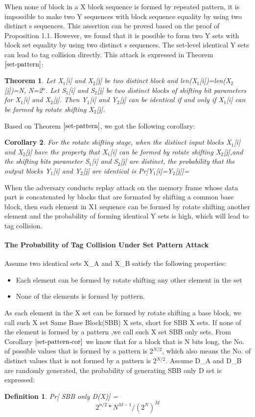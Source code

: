 \documentclass{article}
\newtheorem{theorem}{Theorem}[section]
\newtheorem{corollary}[theorem]{Corollary}
\newtheorem{defination}{Definition}[section]
\begin{document}
When none of block in a X block sequence is formed by repeated pattern, it is impossible to make two Y sequences with block sequence equality by using two distinct s sequences. This assertion can be proved based on the proof of Proposition 1.1. However, we found that it is possible to form two Y sets with block set equality by using two distinct s sequences. The set-level identical Y sets can lead to tag collision directly. This attack is expressed in Theorem $\ref{set-pattern}$:
\begin{theorem}
Let X$_1$[i] and X$_2$[j] be two distinct block and len(X$_1$[i])=len(X$_2$[j])=N, N=2$^n$. Let S$_1$[i] and S$_2$[j] be two distinct blocks of shifting bit parameters for X$_1$[i] and X$_2$[j].
Then Y$_1$[i] and Y$_2$[j] can be identical if and only if X$_1$[i] can be formed by rotate shifting X$_2$[j].
\label{set-pattern}
\end{theorem}
Based on Theorem $\ref{set-pattern}$, we got the following corollary:
\begin{corollary}
For the rotate shifting stage, when the distinct input blocks X$_1$[i] and X$_2$[j] have the property that X$_1$[i] can be formed by rotate shifting X$_2$[j],and the shifting bits parameter S$_1$[i] and S$_2$[j] are distinct, the probability that the output blocks Y$_1$[i] and Y$_2$[j] are identical is Pr[Y$_1$[i]=Y$_2$[j]]=
\label{set-pattern-cor}
\end{corollary}
When the adversary conducts replay attack on the memory frame whose data part is concatenated by blocks that are formated by shifting a common base block, then each element in X1 sequence can be formed by rotate shifting another element and the probability of forming identical Y sets is high, which will lead to tag collision.

\paragraph{The Probability of Tag Collision Under Set Pattern Attack}
Assume two identical sets X\_A and X\_B satisfy the following properties:
\begin{itemize}
	\item Each element can be formed by rotate shifting any other element in the set
	\item None of the elements is formed by pattern.
\end{itemize}
As each element in the X set can be formed by rotate shifting a base block, we call such X set Same Base Block(SBB) X sets, short for SBB X sets. If none of the element is formed by a pattern ,we call such X set SBB only sets.
From Corollary $\ref{set-pattern-cor}$ we know that for a block that is N bits long, the No. of possible values that is formed by a pattern is 2$^{N/2}$, which also means the No. of distinct values that is not formed by a pattern is 2$^{N/2}$. Assume D\_A and D\_B are randomly generated, the probability of generating SBB only D set is expressed:
\begin{defination}
Pr[ SBB only D(X)] =
\begin{equation}
2^{n/2} * N^{M-1} / (2^N)^M
\end{equation}
\end{defination} 
\end{document}
